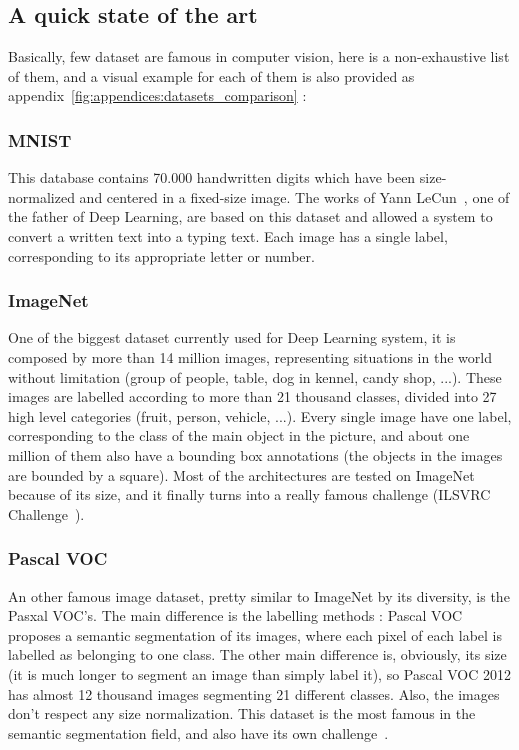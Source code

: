 \subsection{A quick state of the art} \label{2:datasets:soa}
Basically, few dataset are famous in computer vision, here is a non-exhaustive list of them, and a visual example for each of them is also provided as appendix~\ref{fig:appendices:datasets_comparison} :
\subsubsection{MNIST} This database contains 70.000 handwritten digits which have been size-normalized and centered in a fixed-size image. The works of Yann LeCun~\cite{LECU95, LECU98}, one of the father of Deep Learning, are based on this dataset and allowed a system to convert a written text into a typing text. Each image has a single label, corresponding to its appropriate letter or number.
\subsubsection{ImageNet} One of the biggest dataset currently used for Deep Learning system, it is composed by more than 14 million images, representing situations in the world without limitation (group of people, table, dog in kennel, candy shop, ...). These images are labelled according to more than 21 thousand classes, divided into 27 high level categories (fruit, person, vehicle, ...). Every single image have one label, corresponding to the class of the main object in the picture, and about one million of them also have a bounding box annotations (the objects in the images are bounded by a square). Most of the architectures are tested on ImageNet because of its size, and it finally turns into a really famous challenge (ILSVRC Challenge~\cite{RUSS15}).
\subsubsection{Pascal VOC} An other famous image dataset, pretty similar to ImageNet by its diversity, is the Pasxal VOC's. The main difference is the labelling methods : Pascal VOC proposes a semantic segmentation of its images, where each pixel of each label is labelled as belonging to one class. The other main difference is, obviously, its size (it is much longer to segment an image than simply label it), so Pascal VOC 2012 has almost 12 thousand images segmenting 21 different classes. Also, the images don't respect any size normalization. This dataset is the most famous in the semantic segmentation field, and also have its own challenge~\cite{EVER10}.
